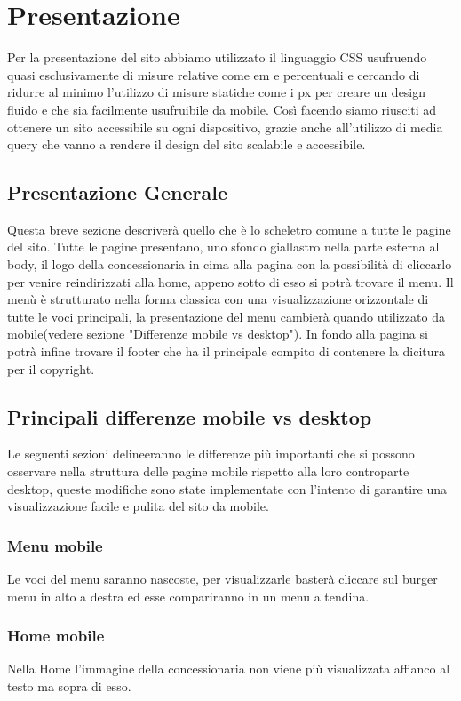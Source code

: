 \section{Presentazione}
    Per la presentazione del sito abbiamo utilizzato il linguaggio CSS usufruendo quasi esclusivamente di misure relative come em e percentuali e cercando di ridurre al minimo l'utilizzo di misure statiche come i px per creare un design fluido e che sia facilmente usufruibile da mobile.
    Così facendo siamo riusciti ad ottenere un sito accessibile su ogni dispositivo, grazie anche all'utilizzo di media query che vanno a rendere il design del sito scalabile e accessibile.
    
    \subsection{Presentazione Generale}
    Questa breve sezione descriverà quello che è lo scheletro comune a tutte le pagine del sito.
    Tutte le pagine presentano, uno sfondo giallastro nella parte esterna al body, il logo della concessionaria in cima alla pagina con la possibilità di cliccarlo per venire reindirizzati alla home, appeno sotto di esso si potrà trovare il menu. Il menù è strutturato nella forma classica con una visualizzazione orizzontale di tutte le voci principali, la presentazione del menu cambierà quando utilizzato da mobile(vedere sezione "Differenze mobile vs desktop"). In fondo alla pagina si potrà infine trovare il footer che ha il principale compito di contenere la dicitura per il copyright.

    \subsection{Principali differenze mobile vs desktop}
    Le seguenti sezioni delineeranno le differenze più importanti che si possono osservare nella struttura delle pagine mobile rispetto alla loro controparte desktop, queste modifiche sono state implementate con l'intento di garantire una visualizzazione facile e pulita del sito da mobile.

        \subsubsection{Menu mobile}
        Le voci del menu saranno nascoste, per visualizzarle basterà cliccare sul burger menu in alto a destra ed esse compariranno in un menu a tendina.

        \subsubsection{Home mobile}
        Nella Home l'immagine della concessionaria non viene più visualizzata affianco al testo ma sopra di esso.

